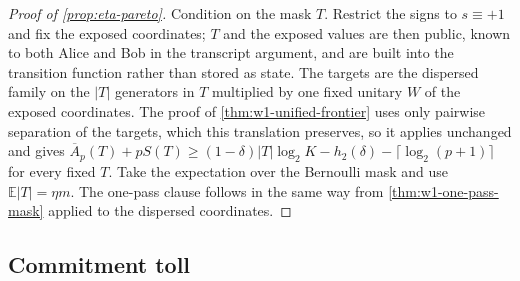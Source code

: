 \begin{proof}[Proof of \cref{prop:eta-pareto}]
Condition on the mask $T$.  Restrict the signs to $s\equiv+1$ and fix the
exposed coordinates; $T$ and the exposed values are then public, known to
both Alice and Bob in the transcript argument, and are built into the
transition function rather than stored as state.  The targets are the
dispersed family on the $|T|$ generators in $T$ multiplied by one fixed
unitary $W$ of the exposed coordinates.  The proof of
\cref{thm:w1-unified-frontier} uses only pairwise separation of the
targets, which this translation preserves, so it applies unchanged and
gives
$\overline A_p(T)+pS(T)\geq(1-\delta)|T|\log_2K-h_2(\delta)
-\lceil\log_2(p+1)\rceil$ for every fixed $T$.  Take the expectation over
the Bernoulli mask and use $\mathbb E|T|=\eta m$.
The one-pass clause follows in the same way from
\cref{thm:w1-one-pass-mask} applied to the dispersed coordinates.
\end{proof}

\subsection{Commitment toll}

